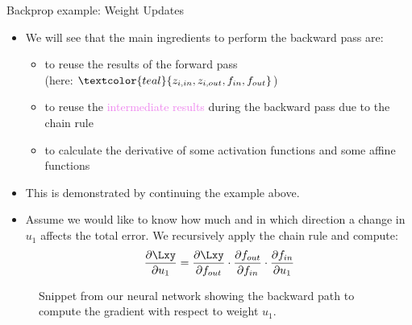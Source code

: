 \begin{vbframe}{Backprop example: Weight Updates}
\begin{itemize}
    \item We will see that the main ingredients to perform the backward pass are: 
    \begin{itemize}
      \item to reuse the results of the forward pass \\ (here:  $\textcolor{teal}{z_{i, in}, z_{i, out}, f_{in},f_{out}}$)
      \item to reuse the \textcolor{violet}{intermediate results} during the backward pass due to the chain rule 
      \item to calculate the derivative of some activation functions and some affine functions
    \end{itemize}
    \item This is demonstrated by continuing the example above.
      \end{itemize}
\framebreak

  \begin{itemize}
    \item Assume we would like to know how much and in which direction a change in $u_1$ affects the total error. We recursively apply the chain rule and compute: $$\frac{\partial \Lxy}{\partial u_1} = \frac{\partial \Lxy}{\partial f_{out}} \cdot \frac{\partial f_{out}}{\partial f_{in}} \cdot \frac{\partial f_{in}}{\partial u_1}$$
  \end{itemize}
  \begin{figure}
    \centering
      \caption{\footnotesize{Snippet from our neural network showing the backward path to compute the gradient with respect to weight $u_1$.}}
  \end{figure}
\framebreak


\end{vbframe}
